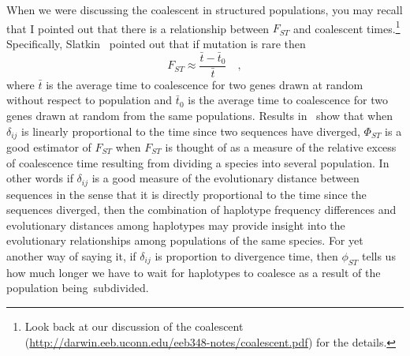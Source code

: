 \documentclass[12pt]{article}
\begin{document}
When we were discussing the coalescent in structured populations, you
may recall that I pointed out that there is a relationship between
$F_{ST}$ and coalescent times.\footnote{Look back at our discussion of
  the coalescent
  (\url{http://darwin.eeb.uconn.edu/eeb348-notes/coalescent.pdf}) for
  the details.}  Specifically, Slatkin~\cite{Slatkin91-coalescence}
pointed out that if mutation is rare then
\[
F_{ST} \approx \frac{\bar t - \bar t_0}{\bar t} \quad ,
\]
where $\bar t$ is the average time to coalescence for two genes drawn
at random without respect to population and $\bar t_0$ is the average
time to coalescence for two genes drawn at random from the same
populations. Results in~\cite{Holsinger-MasonGamer96} show that when
$\delta_{ij}$ is linearly proportional to the time since two sequences
have diverged, $\Phi_{ST}$ is a good estimator of $F_{ST}$ when
$F_{ST}$ is thought of as a measure of the relative excess of
coalescence time resulting from dividing a species into several
population. In other words if $\delta_{ij}$ is a good measure of the
evolutionary distance between sequences in the sense that it is
directly proportional to the time since the sequences diverged, then
the combination of haplotype frequency differences and evolutionary
distances among haplotypes may provide insight into the evolutionary
relationships among populations of the same species. For yet another
way of saying it, if $\delta_{ij}$ is proportion to divergence time,
then $\phi_{ST}$ tells us how much longer we have to wait for
haplotypes to coalesce as a result of the population being~subdivided.




\ccLicense
\end{document}
